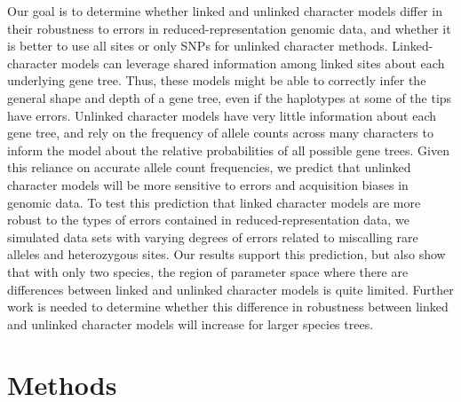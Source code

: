 


Our goal is to determine whether linked and unlinked character models
differ in their robustness to errors in reduced-representation genomic data,
and whether it is better to use all sites or only SNPs for unlinked character
methods.
Linked-character models can leverage shared information among linked sites
about each underlying gene tree.
Thus, these models might be able to correctly infer the general shape and depth
of a gene tree, even if the haplotypes at some of the tips have errors.
Unlinked character models have very little information about each gene tree,
and rely on the frequency of allele counts across many characters to inform the
model about the relative probabilities of all possible gene trees.
Given this reliance on accurate allele count frequencies, we predict that
unlinked character models will be more sensitive to errors and acquisition
biases in genomic data.
To test this prediction that linked character models are more robust to the
types of errors contained in reduced-representation data,
we simulated data sets with varying degrees of errors related to miscalling
rare alleles and heterozygous sites.
Our results support this prediction, but also show that with only two species,
the region of parameter space where there are differences between linked and
unlinked character models is quite limited.
Further work is needed to determine whether this difference in robustness
between linked and unlinked character models will increase for larger species
trees.


\section{Methods}

